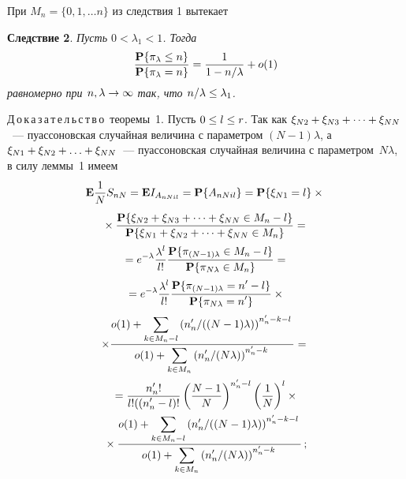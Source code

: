 \begin{multicols}{2}
\medskip

При $M_n=\{0, 1,\dots n\}$ из следствия 1 вытекает

\medskip

\noindent
\textbf{Следствие 2}. \textit{Пусть $0<\lambda_1<1$. Тогда
$$
\displaystyle\frac{\displaystyle \mathbf{P}\{\pi_{\lambda}\le n\}\mathstrut}{\displaystyle \mathbf{P}\{\pi_{\lambda}=n\}\mathstrut}=\displaystyle\frac{\displaystyle 1\mathstrut}{\displaystyle 1-{n}/{\lambda}\mathstrut}+
o(1)
$$
 равномерно при $n, \lambda\hm\to\infty$ так, что
 ${n}/{\lambda}\hm\le\lambda_1$.}

\medskip

\noindent
Д\,о\,к\,а\,з\,а\,т\,е\,л\,ь\,с\,т\,в\,о\ теоремы~1.
Пусть $0\hm\le l\hm\le r$.\linebreak
Так как $\xi_{N2}\hm+\xi_{N3}\hm+ \dots +\xi_{NN}$~---
пуассоновская случайная величина с параметром $(N-1)\lambda$, а
$\xi_{N1}\hm+\xi_{N2}\hm+ \dots \hm+\xi_{NN}$~--- пуассоновская случайная
величина с параметром~$N\lambda$, в силу леммы~1 имеем
\begin{multline*}
\mathbf{E}\displaystyle\frac{\displaystyle 1\mathstrut}{\displaystyle N\mathstrut}S_{nN}=\mathbf{E} I_{A_{nNil}}=\mathbf{P}\{A_{nNil}\} =
\mathbf{P}\{\xi_{N1}=l\}\times{}\\[2pt]
{}\times \displaystyle\frac{\displaystyle \mathbf{P}\{
 \xi_{N2}+\xi_{N3}+ \dots +\xi_{NN}\in M_n-l\}\mathstrut}{\displaystyle \mathbf{P}\{
 \xi_{N1}+\xi_{N2}+ \dots +\xi_{NN}\in M_n\}\mathstrut}={}\\[2pt]
  {}=
e^{-\lambda}\displaystyle\frac{\displaystyle \lambda^l\mathstrut}{\displaystyle l!\mathstrut}\displaystyle\frac{\displaystyle \mathbf{P}\{\pi_{(N-1)\lambda}\in
M_n-l\}\mathstrut}{\displaystyle \mathbf{P}\{\pi_{N\lambda}\in M_n\}\mathstrut} ={}\\[2pt]
{}=e^{-\lambda}\displaystyle\frac{\displaystyle \lambda^l\mathstrut}{\displaystyle l!\mathstrut}\displaystyle\frac{\displaystyle \mathbf{P}\{\pi_{(N-1)\lambda}=
n'-l\}\mathstrut}{\displaystyle \mathbf{P}\{\pi_{N\lambda}=n'\}\mathstrut}\times{}
 \end{multline*}
 \begin{multline*}
\times\displaystyle\frac{\displaystyle o(1)+\sum\limits_{k\in
M_n-l}\left({n'_n}/{((N-1)\lambda)}\right)^{n'_n-k-l}\mathstrut}{\displaystyle 
o(1)+\sum\limits_{k\in M_n}\left({n'_n}/{(N\lambda)}\right)^{n'_n-k}\mathstrut} ={}\\[1pt]
{}=\displaystyle\frac{\displaystyle n'_n!\mathstrut}{\displaystyle l!((n'_n-l)!\mathstrut}\left(\displaystyle\frac{\displaystyle N-1\mathstrut}{\displaystyle N\mathstrut}\right)^{n'_n-l}\left(\displaystyle\frac{\displaystyle 1\mathstrut}{\displaystyle N\mathstrut}\right)^{l}\times{}\\[1pt]
{}\times
\displaystyle\frac{\displaystyle o(1)+\sum\limits_{k\in M_n-l}\left({n'_n}/{((N-1)\lambda)}\right)^{n'_n-k-l}\mathstrut}{\displaystyle 
o(1)+\sum\limits_{k\in M_n}\left({n'_n}/{(N\lambda)}\right)^{n'_n-k}\mathstrut}\,;
\end{multline*}

\vspace*{-6pt}


\end{multicols}
